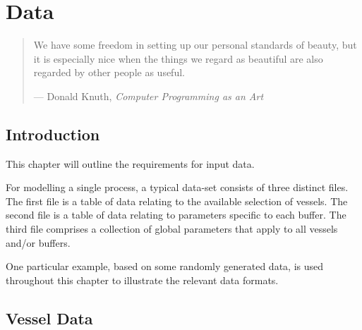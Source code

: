 %
%
%
%

\chapter{Data}\label{C.data}

\begin{quote}
We have some freedom in setting up our personal standards of beauty, but it is
especially nice when the things we regard as beautiful are also regarded by
other people as useful.

\hspace{2cm}--- Donald Knuth, \emph{Computer Programming as an Art}
\end{quote}

\section{Introduction}\label{S.intro3}
This chapter will outline the requirements for input data.

For modelling a single process, a typical data-set consists of three distinct
files.
The first file is a table of data relating to the available selection of
vessels.
The second file is a table of data relating to parameters specific
to each buffer.
The third file comprises a collection of global parameters
that apply to all vessels and/or buffers.

One particular example, based on some randomly generated data, is used
throughout this chapter to illustrate the relevant data formats.

\section{Vessel Data}\label{S.vesseldata}


